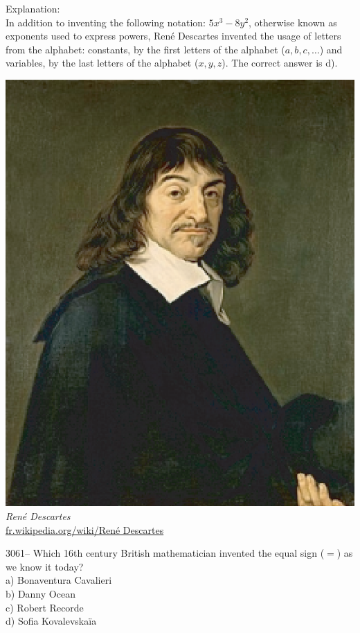 \documentclass[letterpaper, 12pt]{article}
\begin{document}
Explanation:\\
In addition to inventing the following notation: $5x^{3} - 8y^{2}$, otherwise known as exponents used to express powers, Ren\'e Descartes invented the usage of letters from the alphabet: constants, by the first letters of the alphabet ($a, b, c, \dots$)  and variables, by the last letters of the alphabet  ($x, y, z$). The correct answer is d).\\
\begin{center}
\includegraphics[scale=0.4]{Descartes.eps}\\
\emph{{\small Ren\'e Descartes}}\\
\href{http://fr.wikipedia.org/wiki/Ren\%C3\%A9 Descartes}{fr.wikipedia.org/wiki/Ren\'e Descartes}\\[5mm]
\end{center}

3061-- Which 16th century British mathematician invented the equal sign ($=$) as we know it today?\\

a) Bonaventura Cavalieri\\
b) Danny Ocean\\
c) Robert Recorde\\
d) Sofia Kovalevska\"ia\\
\end{document}
